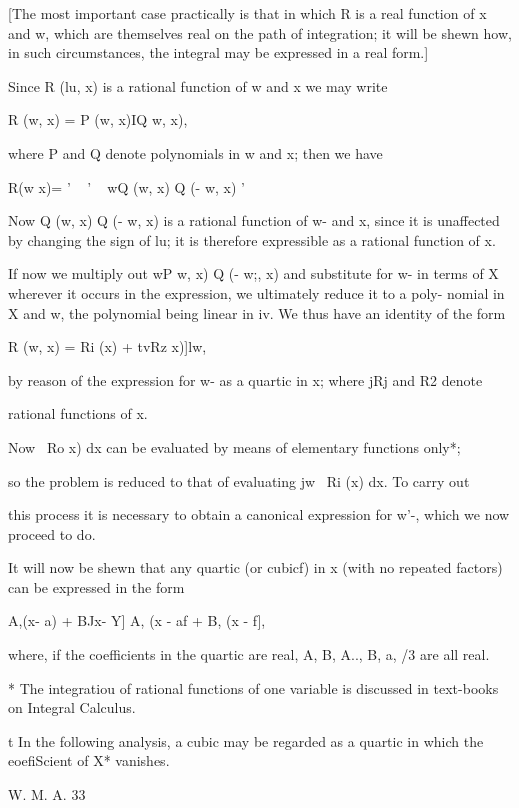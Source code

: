 [The most important case practically is that in which R is a real
function of x and w, which are themselves real on the path of
integration; it will be shewn how, in such circumstances, the
integral may be expressed in a real form.]

Since R (lu, x) is a rational function of w and x we may write

R (w, x) = P (w, x)IQ w, x),

where P and Q denote polynomials in w and x; then we have

R(w x)= ' ~ ' ~ wQ (w, x) Q (- w, x) '

Now Q (w, x) Q (- w, x) is a rational function of w- and x, since it
is unaffected by changing the sign of lu; it is therefore expressible
as a rational function of x.

If now we multiply out wP w, x) Q (- w;, x) and substitute for w- in
terms of X wherever it occurs in the expression, we ultimately reduce
it to a poly- nomial in X and w, the polynomial being linear in iv. We
thus have an identity of the form

R (w, x) = Ri (x) + tvRz x)]lw,

by reason of the expression for w- as a quartic in x; where jRj and
R2 denote

rational functions of x.

Now \ Ro x) dx can be evaluated by means of elementary functions
only*;

so the problem is reduced to that of evaluating jw~ Ri (x) dx. To
carry out

this process it is necessary to obtain a canonical expression for w'-,
which we now proceed to do.


It will now be shewn that any quartic (or cubicf) in x (with no
repeated factors) can be expressed in the form

 A,(x- a) + BJx- Y] A, (x - af + B, (x - f],

where, if the coefficients in the quartic are real, A, B, A.., B,
a, /3 are all real.

* The integratiou of rational functions of one variable is discussed
in text-books on Integral Calculus.

t In the following analysis, a cubic may be regarded as a quartic in
which the eoefiScient of X* vanishes.

W. M. A. 33

%
%

